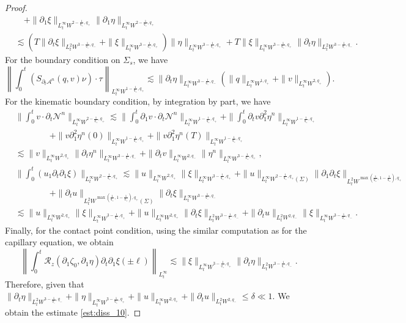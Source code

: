 \documentclass[letterpaper,reqno,10pt,twoside]{amsart}
\theoremstyle{definition}
\theoremstyle{remark}
\def\p{\partial}
\begin{document}
\begin{proof}
\[\begin{aligned}
			&\quad+\|\p_{1}\xi\|_{L_{t}^{\infty}W^{2-\frac{1}{q_{+}},q_{+}}}\|\p_{1}\eta\|_{L_{t}^{\infty}W^{2-\frac{1}{q_{+}},q_{+}}}\\
			&\lesssim \left( T\|\p_{t}\xi\|_{L_{t}^{2}W^{3-\frac{1}{q_{-}},q_{-}}} +\|\xi\|_{L_{t}^{\infty}W^{3-\frac{1}{q_{+}},q_{+}}} \right)\|\eta\|_{L_{t}^{\infty}W^{3-\frac{1}{q_{+}},q_{+}}} +T\|\xi\|_{L_{t}^{\infty}W^{3-\frac{1}{q_{+}},q_{+}}}\|\p_{t}\eta\|_{L_{t}^{2}W^{3-\frac{1}{q_{-}},q_{-}}}.
		\end{aligned}
		\]
		For the boundary condition on $\Sigma_{s}$, we have
		\[
		\left\|\int_{0}^{t}(S_{\p_{t}\mathcal{A}^{n}}(q,v)\nu)\cdot \tau \right\|_{L_{t}^{\infty}W^{1-\frac{1}{q_{+}},q_{+}}}\lesssim \|\p_{t}\eta\|_{L_{t}^{\infty}W^{3-\frac{1}{q_{-}},q_{-}}}(\|q\|_{L_{t}^{\infty}W^{1,q_{+}}}+\|v\|_{L_{t}^{\infty}W^{2,q_{+}}}).
		\]
		For the kinematic boundary condition, by integration by part, we have
		\[
		\begin{aligned}
			&\|\int_{0}^{t}v\cdot \p_{t}\mathcal{N}^{n}\|_{L_{t}^{\infty}W^{2-\frac{1}{q_{+}},q_{+}}}\lesssim \|\int_{0}^{t}\p_{1}v\cdot \p_{t}\mathcal{N}^{n}\|_{L_{t}^{\infty}W^{1-\frac{1}{q_{+}},q_{+}}}+\|\int_{0}^{t}\p_{t}v\p_{1}^{2}\eta^{n}\|_{L_{t}^{\infty}W^{1-\frac{1}{q_{+}},q_{+}}}\\
			&\qquad\qquad+\|v\p_{1}^{2}\eta^{n}(0)\|_{L_{t}^{\infty}W^{1-\frac{1}{q_{+}},q_{+}}}+\|v\p_{1}^{2}\eta^{n}(T)\|_{L_{t}^{\infty}W^{1-\frac{1}{q_{+}},q_{+}}}\\&\lesssim \|v\|_{L_{t}^{\infty}W^{2,q_{+}}}\|\p_{t}\eta^{n}\|_{L_{t}^{\infty}W^{3-\frac{1}{q_{-}},q_{-}}}+\|\p_{t}v\|_{L_{t}^{\infty}W^{2,q_{-}}}\|\eta^{n}\|_{L_{t}^{\infty}W^{3-\frac{1}{q_{+}},q_{+}}},\\
			&\|\int_{0}^{t}(u_{1} \p_{t}\p_{1}\xi)\|_{L_{t}^{\infty}W^{2-\frac{1}{q_{+}},q_{+}}}\lesssim \|u\|_{L_{t}^{\infty}W^{2,q_{+}}}\|\xi\|_{L_{t}^{\infty}W^{3-\frac{1}{q_{+}},q_{+}}}+\|u\|_{L_{t}^{\infty}W^{2-\frac{1}{q_{+}},q_{+}}(\Sigma)}\|\p_{1}\p_{t}\xi\|_{L_{t}^{2}W^{\max(\frac{1}{q_{+}},1-\frac{1}{q_{+}}),q_{+}}}\\
			&\qquad\qquad+\|\p_{t}u\|_{L_{t}^{2}W^{\max(\frac{1}{q_{+}},1-\frac{1}{q_{+}}),q_{+}}(\Sigma)}\|\p_{t}\xi\|_{L_{t}^{\infty}W^{3-\frac{1}{q_{-}},q_{-}}}\\
			&\lesssim \|u\|_{L_{t}^{\infty}W^{2,q_{+}}}\|\xi\|_{L_{t}^{\infty}W^{3-\frac{1}{q_{+}},q_{+}}}+\|u\|_{L_{t}^{\infty}W^{2,q_{+}}}\|\p_{t}\xi\|_{L_{t}^{2}W^{3-\frac{1}{q_{-}},q_{-}}}+\|\p_{t}u\|_{L_{t}^{2}W^{2,q_{-}}}\|\xi\|_{L_{t}^{\infty}W^{3-\frac{1}{q_{-}},q_{-}}}.
		\end{aligned}
		\]
		Finally, for the contact point condition, using the similar computation as for the capillary equation, we obtain
		\[
		\left \|\int_{0}^{t}\mathcal{R}_{z}(\p_{1}\zeta_0,\p_{1}\eta)\p_{t}\p_{1}\xi(\pm\ell) \right\|_{L_{t}^{\infty}}\lesssim \|\xi\|_{L_{t}^{\infty}W^{3-\frac{1}{q_{+}},q_{+}}}\|\p_{t}\eta\|_{L_{t}^{2}W^{3-\frac{1}{q_{-}},q_{-}}}.
		\]
		\noindent Therefore, given that $\|\p_{t}\eta\|_{L_{t}^{2}W^{3-\frac{1}{q_{-}},q_{-}}}+\|\eta\|_{L_{t}^{\infty}W^{3-\frac{1}{q_{+}},q_{+}}}+\|u\|_{L_{t}^{\infty}W^{2,q_{+}}}+\|\p_{t}u\|_{L_{t}^{2}W^{2,q_{-}}}\leq\delta\ll 1$. We obtain the estimate \eqref{est:diss_10}.
	\end{proof}
	
\end{document}
